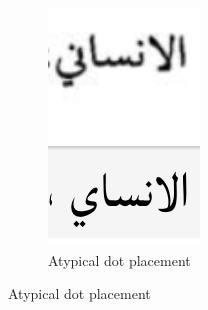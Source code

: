 \begin{figure}[h]
	\begin{subfigure}[b]{0.3\linewidth}
	\centering
	\includegraphics[width=\linewidth]{images/image22.png}
	\caption{Atypical dot placement}
	\label{fig:fig11}
	\end{subfigure}


\end{figure}
